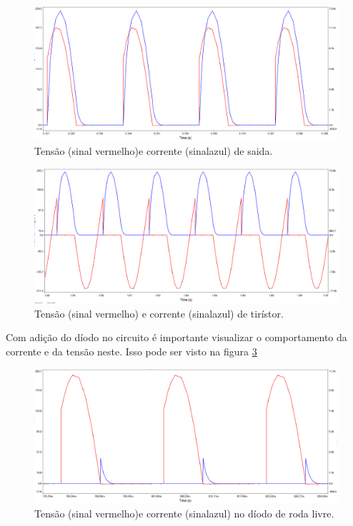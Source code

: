 \documentclass[a4paper,11pt]{article}
\numberwithin{equation}{section}
\begin{document}
\begin{figure}[h]
	\centering
	\includegraphics[keepaspectratio=true, scale=0.3]{img/circuito10}
	\caption{Tensão (sinal vermelho)e corrente (sinalazul) de saida.}
	\label{fig:circuit_12}
	\vspace{-0.8em}
\end{figure}
\begin{figure}[h]
	\centering
	\includegraphics[keepaspectratio=true, scale=0.3]{img/circuito11}
	\caption{Tensão (sinal vermelho) e corrente (sinalazul) de tirístor.}
	\label{fig:circuit_13}
	\vspace{-0.8em}
\end{figure}
\pagebreak
Com adição do díodo no circuito é importante visualizar o comportamento da corrente e da tensão neste. Isso pode ser visto na figura \ref{fig:circuit_14}

\begin{figure}[h]
	\centering
	\includegraphics[keepaspectratio=true, scale=0.3]{img/circuito12}
	\caption{Tensão (sinal vermelho)e corrente (sinalazul) no díodo de roda livre.}
	\label{fig:circuit_14}
	\vspace{-0.8em}
\end{figure}
\end{document}
